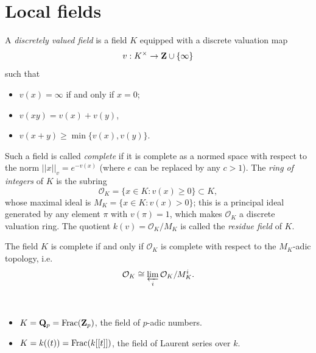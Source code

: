 \documentclass{article}
\begin{document}
\section{Local fields}
\begin{defn}
		A \emph{discretely valued field} is a field $K$ equipped with a discrete valuation map
		\[
			v:K^\times \to \mathbf{Z} \cup \{\infty\}
		\]
		such that
		\begin{itemize}
				\item $v(x)=\infty$ if and only if $x=0$;
				\item $v(xy) = v(x)+v(y)$,
				\item $v(x+y) \ge \min\{v(x),v(y)\}$.
		\end{itemize}
\end{defn}
Such a field is called \emph{complete} if it is complete as a normed space with respect to the norm $||x||_v = e^{-v(x)}$ (where $e$ can be replaced by any $c>1$). The \emph{ring of integers} of $K$ is the subring
\[
		\mathcal{O}_K = \{x\in K: v(x)\ge 0\}\subset K,
\]
whose maximal ideal is $M_K = \{x\in K: v(x)>0\}$; this is a principal ideal generated by any element $\pi$ with $v(\pi)=1$, which makes $\mathcal{O}_K$ a discrete valuation ring. The quotient $k(v)=\mathcal{O}_K/M_K$ is called the \emph{residue field} of $K$.

\begin{fact}
		The field $K$ is complete if and only if $\mathcal{O}_K$ is complete with respect to the $M_K$-adic topology, i.e. 
		\[
			\mathcal{O}_K \cong \varprojlim_i \mathcal{O}_K/M_K^i.
		\]
\end{fact}

\begin{exmp}\
		\begin{itemize}
				\item $K=\mathbf{Q}_p=\operatorname{Frac}(\mathbf{Z}_p)$, the field of $p$-adic numbers.
				\item $K=k((t)) = \operatorname{Frac}(k[[t]])$, the field of Laurent series over $k$.
		\end{itemize}
\end{exmp}
\end{document}
